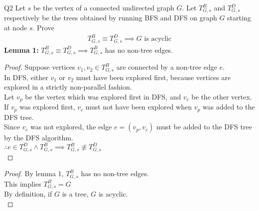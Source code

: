 \begin{problem}
  {Q2}
  Let $s$ be the vertex of a connected undirected graph $G$. Let $T_{G,s}^{B}$ and $T_{G,s}^{D}$ respectively
  be the trees obtained by running BFS and DFS on graph $G$ starting at node $s$. Prove
  \begin{align*}
    T_{G,s}^{B} \equiv T_{G,s}^{D} \implies G \text{ is acyclic}
  \end{align*}
  \textbf{Lemma 1: }$T_{G,s}^{B} \equiv T_{G,s}^{D} \implies T_{G,s}^{B}$ has no non-tree edges.
  \begin{proof}
    Suppose vertices $v_1, v_2 \in T_{G,s}^{B}$ are connected by a non-tree edge $e$. \\
    In DFS, either $v_1$ or $v_2$ must have been explored first, because vertices are explored in a strictly non-parallel fashion. \\
    Let $v_p$ be the vertex which was explored first in DFS, and $v_c$ be the other vertex. \\
    If $v_p$ was explored first, $v_c$ must not have been explored when $v_p$ was added to the DFS tree. \\
    Since $v_c$ was not explored, the edge $e = (v_p, v_c)$ must be added to the DFS tree by the DFS algorithm. \\
    $\therefore e \in T_{G,s}^{D} \land T_{G,s}^{B} \implies T_{G,s}^{B} \not\equiv T_{G,s}^{D}$ \\
  \end{proof}
  \begin{proof}
    By lemma 1, $T_{G,s}^{B}$ has no non-tree edges. \\
    This implies $T_{G,s}^{B} = G$ \\
    By definition, if $G$ is a tree, $G$ is acyclic. \\
  \end{proof}
\end{problem}
